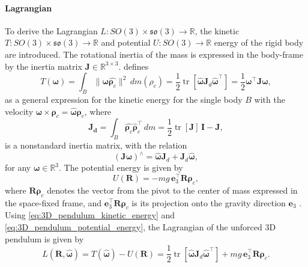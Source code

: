 \paragraph{Lagrangian}

To derive the Lagrangian $L:SO(3) \times\mathfrak{so}(3) \to \mathbb{R}$, the kinetic $T:SO(3) \times\mathfrak{so}(3) \to \mathbb{R} $ and potential $U:SO(3) \to \mathbb{R}$ energy of the rigid body are introduced. The rotational inertia of the mass is expressed in the body-frame by the inertia matrix $\bm{J} \in \mathbb{R}^{3 \times 3}$. \cite{Lee2008} defines 
\begin{equation}\label{eq:3D_pendulum_kinetic_energy}
T(\bm{\omega}) = \int_{B} \lVert \bm{\omega} \hat{\bm{\rho}_c} \rVert^{2} \, dm(\rho_c)
= \frac{1}{2}\operatorname{tr}[\hat{\bm{\omega}} \bm{J}_d \hat{\bm{\omega}}^\top]
= \frac{1}{2} \bm{\omega}^\top \bm{J} \bm{\omega},
\end{equation}
as a general expression for the kinetic energy for the single body $B$ with the velocity $\bm{\omega} \times \bm{\rho}_c = \bm{\hat{\omega}}\bm{\rho}_c$, where 
\begin{equation}\label{eq:non-standard_inertia}
    \bm{J_d} = \int_{B} \hat{\bm{\rho}_c} \hat{\bm{\rho}}_c^\top  \, dm 
    =\frac{1}{2}\operatorname{tr}[\bm{J}]\,\bm{I}-\bm{J},
\end{equation}
is a nonstandard inertia matrix, with the relation
\begin{equation} \label{eq:nonstandard_Inertia_Relation}
    (\bm{J\omega})^\wedge = \hat{\bm{\omega}}\bm{J}_d + \bm{J}_d \hat{\bm{\omega}},
\end{equation}
for any $\bm{\omega}\in\mathbb{R}^3$. The potential energy is given by
\begin{equation}\label{eq:3D_pendulum_potential_energy}
    U(\bm{R}) = -mg\, \bm{e}_3^\top \bm{R}\bm{\rho}_c,
\end{equation}
where \(\bm{R}\bm{\rho}_c\) denotes the vector from the pivot to the center of mass expressed in the space-fixed frame, and \(\bm{e}_3^\top \bm{R}\bm{\rho}_c\) is its projection onto the gravity direction \(\bm{e}_3\) \cite{Lee2008}. Using \eqref{eq:3D_pendulum_kinetic_energy} and \eqref{eq:3D_pendulum_potential_energy}, the Lagrangian of the unforced 3D pendulum is given by 
\begin{equation}\label{eq:continuous_3D_pendulum_lagrangian}
    L(\bm{R}, \hat{\bm{\omega}}) = T(\hat{\bm{\omega}}) - U(\bm{R})
    = \frac{1}{2}\operatorname{tr}[\hat{\bm{\omega}} \bm{J}_d \hat{\bm{\omega}}^\top] + mg\, \bm{e}_3^\top \bm{R}\bm{\rho}_c.
\end{equation}


